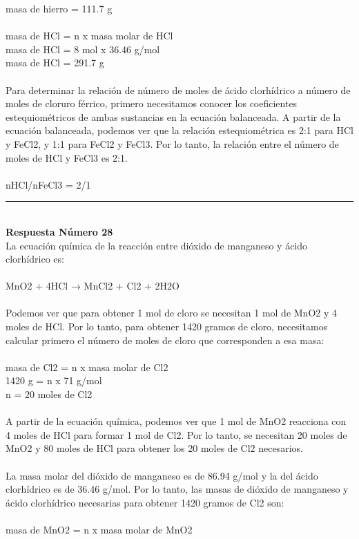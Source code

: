 \documentclass{article}
\begin{document}
masa de hierro = 111.7 g\\
\\
masa de HCl = n x masa molar de HCl\\
masa de HCl = 8 mol x 36.46 g/mol\\
masa de HCl = 291.7 g\\
\\
Para determinar la relación de número de moles de ácido clorhídrico a número de moles de cloruro férrico, primero necesitamos conocer los coeficientes estequiométricos de ambas sustancias en la ecuación balanceada. A partir de la ecuación balanceada, podemos ver que la relación estequiométrica es 2:1 para HCl y FeCl2, y 1:1 para FeCl2 y FeCl3. Por lo tanto, la relación entre el número de moles de HCl y FeCl3 es 2:1.\\
\\
nHCl/nFeCl3 = 2/1\\
\noindent\rule{\textwidth}{1pt} \\
\textbf{Respuesta Número 28} \\
La ecuación química de la reacción entre dióxido de manganeso y ácido clorhídrico es:\\
\\
MnO2 + 4HCl → MnCl2 + Cl2 + 2H2O\\
\\
Podemos ver que para obtener 1 mol de cloro se necesitan 1 mol de MnO2 y 4 moles de HCl. Por lo tanto, para obtener 1420 gramos de cloro, necesitamos calcular primero el número de moles de cloro que corresponden a esa masa:\\
\\
masa de Cl2 = n x masa molar de Cl2\\
1420 g = n x 71 g/mol\\
n = 20 moles de Cl2\\
\\
A partir de la ecuación química, podemos ver que 1 mol de MnO2 reacciona con 4 moles de HCl para formar 1 mol de Cl2. Por lo tanto, se necesitan 20 moles de MnO2 y 80 moles de HCl para obtener los 20 moles de Cl2 necesarios.\\
\\
La masa molar del dióxido de manganeso es de 86.94 g/mol y la del ácido clorhídrico es de 36.46 g/mol. Por lo tanto, las masas de dióxido de manganeso y ácido clorhídrico necesarias para obtener 1420 gramos de Cl2 son:\\
\\
masa de MnO2 = n x masa molar de MnO2\\
\end{document}
